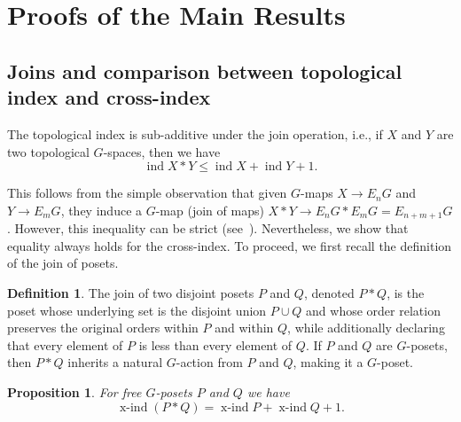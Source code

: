 \documentclass[preprint,12pt]{article}
\renewcommand{\le}{\leqslant}
\newtheorem{proposition}[theorem]{Proposition}
\theoremstyle{definition}
\newtheorem{definition}[theorem]{Definition}
\theoremstyle{remark}
\numberwithin{equation}{section}
\DeclareMathOperator{\ind}{ind}
\DeclareMathOperator{\xind}{x-ind}
\begin{document}
\section{Proofs of the Main Results}

\subsection{Joins and comparison between topological index and cross-index}

\label{Subsection: Join}
The topological index is sub-additive under the join operation, i.e., if \( X \) and \( Y \) are two topological \( G \)-spaces, then we have
\begin{equation}\label{eq: join}
    \ind X \ast Y \le \ind X + \ind Y + 1.
\end{equation}

This follows from the simple observation that given \( G \)-maps \( X \to E_nG \) and \( Y \to E_mG \), they induce a \( G \)-map (join of maps) \( X \ast Y \to E_nG \ast E_mG = E_{n+m+1}G \). However, this inequality can be strict (see~\cite{csorba2007homotopy}). Nevertheless, we show that equality always holds for the cross-index.  To proceed, we first recall the definition of the join of posets.

\begin{definition}
The join of two disjoint posets $P$ and $Q$, denoted $P \ast Q$, is the poset whose underlying set is the disjoint union $P \cup Q$ and whose order relation preserves the original orders within $P$ and within $Q$, while additionally declaring that every element of $P$ is less than every element of $Q$. If $P$ and $Q$ are $G$-posets, then $P \ast Q$ inherits a natural $G$-action from $P$ and $Q$, making it a $G$-poset.    
\end{definition}

\begin{proposition}\label{prop: join}
For free $G$-posets $P$ and $Q$ we have
$$\xind(P\ast Q)= \xind P+ \xind Q +1.$$
\end{proposition}
\end{document}
